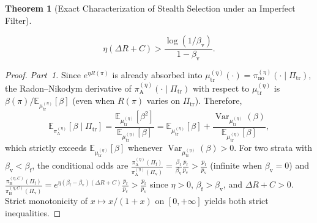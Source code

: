\documentclass[11pt,a4paper]{article}
\newtheorem{theorem}{Theorem}
\newcommand{\E}{\mathbb{E}}
\newcommand{\Var}{\operatorname{Var}}
\begin{document}
\begin{theorem}[Exact Characterization of Stealth Selection under an Imperfect Filter]
\begin{enumerate}
\begin{enumerate}
    \begin{equation}\label{eq:inversion}
      \eta(\Delta R + C) > \frac{\log(1/\beta_{\mathrm{v}})}{1 - \beta_{\mathrm{v}}}.
    \end{equation}
  \end{enumerate}
\end{enumerate}
\end{theorem}

\begin{proof}
\emph{Part~1.} Since $e^{\eta R(\pi)}$ is already absorbed into $\mu_{\mathrm{tr}}^{(\eta)}(\cdot) = \pi_{\mathrm{no}}^{(\eta)}(\cdot \mid \Pi_{\mathrm{tr}})$, the Radon--Nikodym derivative of $\pi_{\mathrm{A}}^{(\eta)}(\cdot \mid \Pi_{\mathrm{tr}})$ with respect to $\mu_{\mathrm{tr}}^{(\eta)}$ is $\beta(\pi) / \E_{\mu_{\mathrm{tr}}^{(\eta)}}[\beta]$ (even when $R(\pi)$ varies on $\Pi_{\mathrm{tr}}$). Therefore,
\[
  \E_{\pi_{\mathrm{A}}^{(\eta)}}[\beta \mid \Pi_{\mathrm{tr}}]
  = \frac{\E_{\mu_{\mathrm{tr}}^{(\eta)}}[\beta^2]}{\E_{\mu_{\mathrm{tr}}^{(\eta)}}[\beta]}
  = \E_{\mu_{\mathrm{tr}}^{(\eta)}}[\beta] + \frac{\Var_{\mu_{\mathrm{tr}}^{(\eta)}}(\beta)}{\E_{\mu_{\mathrm{tr}}^{(\eta)}}[\beta]},
\]
which strictly exceeds $\E_{\mu_{\mathrm{tr}}^{(\eta)}}[\beta]$ whenever $\Var_{\mu_{\mathrm{tr}}^{(\eta)}}(\beta) > 0$. For two strata with $\beta_{\mathrm{v}} < \beta_{\mathrm{f}}$, the conditional odds are $\frac{\pi_{\mathrm{A}}^{(\eta)}(\Pi_{\mathrm{f}})}{\pi_{\mathrm{A}}^{(\eta)}(\Pi_{\mathrm{v}})} = \frac{\beta_{\mathrm{f}}}{\beta_{\mathrm{v}}}\frac{p_{\mathrm{f}}}{p_{\mathrm{v}}} > \frac{p_{\mathrm{f}}}{p_{\mathrm{v}}}$ (infinite when $\beta_{\mathrm{v}} = 0$) and $\frac{\pi_{\mathrm{B}}^{(\eta, C)}(\Pi_{\mathrm{f}})}{\pi_{\mathrm{B}}^{(\eta, C)}(\Pi_{\mathrm{v}})} = e^{\eta(\beta_{\mathrm{f}} - \beta_{\mathrm{v}})(\Delta R + C)}\frac{p_{\mathrm{f}}}{p_{\mathrm{v}}} > \frac{p_{\mathrm{f}}}{p_{\mathrm{v}}}$ since $\eta > 0$, $\beta_{\mathrm{f}} > \beta_{\mathrm{v}}$, and $\Delta R + C > 0$. Strict monotonicity of $x \mapsto x/(1+x)$ on $[0, +\infty]$ yields both strict inequalities.


\end{proof}
\end{document}
